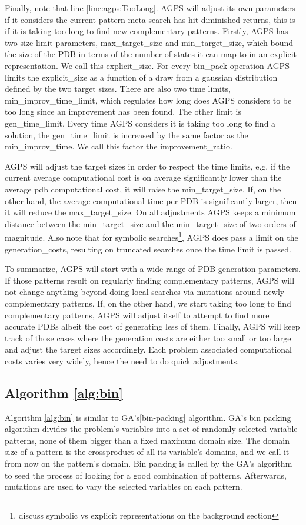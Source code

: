 \documentclass{article}
\begin{document}
Finally, note that line \ref{line:agps:TooLong}.  AGPS will adjust its own parameters if it considers the current pattern meta-search has hit diminished returns, this is if it is taking too long to find new complementary patterns.  Firstly, AGPS has two size limit parameters, max\_target\_size and min\_target\_size, which bound the size of the PDB in terms of the number of states it can map to in an explicit representation.  We call this explicit\_size.  For every bin\_pack operation AGPS limits the explicit\_size as a function of a draw from a gaussian distribution defined by the two target sizes.  There are also two time limits, min\_improv\_time\_limit, which regulates how long does AGPS considers to be too long since an improvement has been found.  The other limit is gen\_time\_limit.  Every time AGPS considers it is taking too long to find a solution, the  gen\_time\_limit is increased  by the same factor as the min\_improv\_time.  We call this factor the improvement\_ratio.  

AGPS will adjust the target sizes in order to respect the time limits, e.g. if the current average computational cost is on average significantly lower than the average pdb computational cost, it will raise the min\_target\_size.  If, on the other hand, the average computational time per PDB is significantly larger, then it will reduce the max\_target\_size.  On all adjustments AGPS keeps a minimum distance between the min\_target\_size and the min\_target\_size of two orders of magnitude.  Also note that for symbolic searches\footnote{discuss symbolic vs explicit representations on the background section}, AGPS does pass a limit on the generation\_costs, resulting on truncated searches once the time limit is passed.

To summarize, AGPS will start with a wide range of PDB generation parameters.  If those patterns result on regularly finding complementary patterns, AGPS will not change anything beyond doing local searches via mutations around newly complementary patterns.  If, on the other hand, we start taking too long to find complementary patterns, AGPS will adjust itself to attempt to find more accurate PDBs albeit the cost of generating less of them.  Finally, AGPS will keep track of those cases where the generation costs are either too small or too large and adjust the target sizes accordingly.  Each problem associated computational costs varies very widely, hence the need to do quick adjustments.
\subsection{Algorithm \ref{alg:bin} }\label{subsec:Algo2}
Algorithm \ref{alg:bin} is similar to GA's[bin-packing] algorithm.  GA's bin packing algorithm divides the problem's variables into a set of randomly selected variable patterns, none of them bigger than a fixed maximum domain size.  The domain size of a pattern is the crossproduct of all its variable's domains, and we call it from now on the pattern's domain.  Bin packing is called by the GA's algorithm to seed the process of looking for a good combination of patterns.  Afterwards, mutations are used to vary the selected variables on each pattern.
\end{document}
